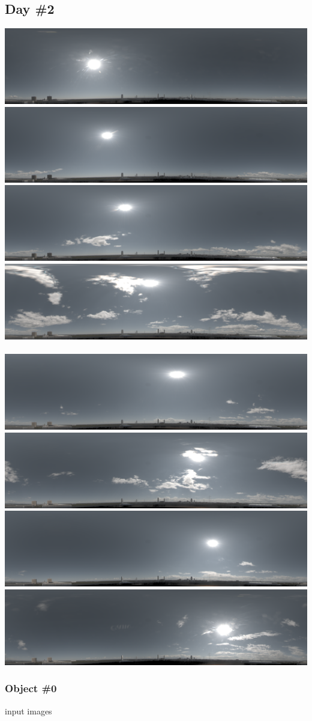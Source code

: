 \begin{center}
\protect\hypertarget{extraresultsd2}{}{}

\clearpage
\hypertarget{day-2}{%
\subsection*{Day \#2}\label{day-2}}

\includegraphics[width=0.24\linewidth]{semisynthetic/20160617/094515.png}
\includegraphics[width=0.24\linewidth]{semisynthetic/20160617/104118.png}
\includegraphics[width=0.24\linewidth]{semisynthetic/20160617/113719.png}
\includegraphics[width=0.24\linewidth]{semisynthetic/20160617/123326.png}\\
~\\
\includegraphics[width=0.24\linewidth]{semisynthetic/20160617/132927.png}
\includegraphics[width=0.24\linewidth]{semisynthetic/20160617/142534.png}
\includegraphics[width=0.24\linewidth]{semisynthetic/20160617/152137.png}
\includegraphics[width=0.24\linewidth]{semisynthetic/20160617/161740.png}\\

\hypertarget{object-0-1}{%
\subsubsection*{Object \#0}\label{object-0-1}}

input images


\end{center}
